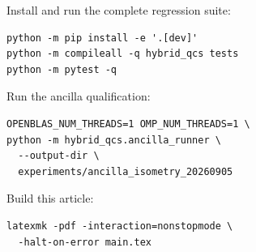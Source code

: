 Install and run the complete regression suite:
\begin{verbatim}
python -m pip install -e '.[dev]'
python -m compileall -q hybrid_qcs tests
python -m pytest -q
\end{verbatim}

Run the ancilla qualification:
\begin{verbatim}
OPENBLAS_NUM_THREADS=1 OMP_NUM_THREADS=1 \
python -m hybrid_qcs.ancilla_runner \
  --output-dir \
  experiments/ancilla_isometry_20260905
\end{verbatim}

Build this article:
\begin{verbatim}
latexmk -pdf -interaction=nonstopmode \
  -halt-on-error main.tex
\end{verbatim}
